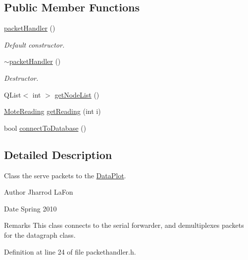 \subsection*{Public Member Functions}
\begin{DoxyCompactItemize}
\item 
\hyperlink{classpacketHandler_a02936b9105618ed38701274efcfa0dfb}{packetHandler} ()
\begin{DoxyCompactList}\small\item\em Default constructor. \item\end{DoxyCompactList}\item 
\hypertarget{classpacketHandler_ad3c118caa3c1f8ace95c67af0843f01b}{
\hyperlink{classpacketHandler_ad3c118caa3c1f8ace95c67af0843f01b}{$\sim$packetHandler} ()}
\label{classpacketHandler_ad3c118caa3c1f8ace95c67af0843f01b}

\begin{DoxyCompactList}\small\item\em Destructor. \item\end{DoxyCompactList}\item 
QList$<$ int $>$ \hyperlink{classpacketHandler_a7d07166d577b014234ad311599ac3291}{getNodeList} ()
\item 
\hyperlink{classMoteReading}{MoteReading} \hyperlink{classpacketHandler_aec6fa94602daa18227491b76001152cb}{getReading} (int i)
\item 
bool \hyperlink{classpacketHandler_a9366836a2e226a3193bea82dcbe80b5d}{connectToDatabase} ()
\end{DoxyCompactItemize}


\subsection{Detailed Description}
Class the serve packets to the \hyperlink{classDataPlot}{DataPlot}. \begin{DoxyAuthor}{Author}
Jharrod LaFon 
\end{DoxyAuthor}
\begin{DoxyDate}{Date}
Spring 2010 
\end{DoxyDate}
\begin{DoxyRemark}{Remarks}
This class connects to the serial forwarder, and demultiplexes packets for the datagraph class. 
\end{DoxyRemark}


Definition at line 24 of file packethandler.h.



